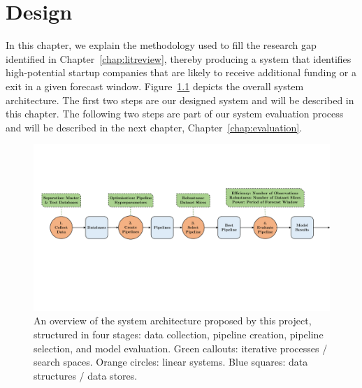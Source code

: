 \documentclass[../thesis/thesis.tex]{subfiles}
\begin{document}
\chapter{Design}
\label{chap:design}

In this chapter, we explain the methodology used to fill the research gap identified in Chapter~\ref{chap:litreview}, thereby producing a system that identifies high-potential startup companies that are likely to receive additional funding or a exit in a given forecast window. Figure~\ref{fig:design:system_architecture} depicts the overall system architecture. The first two steps are our designed system and will be described in this chapter. The following two steps are part of our system evaluation process and will be described in the next chapter, Chapter~\ref{chap:evaluation}.

\begin{figure}[!htb]
    \centering
    \includegraphics[width=\textwidth]{../figures/design/system_architecture}
    \caption[System architecture flowchart]{An overview of the system architecture proposed by this project, structured in four stages: data collection, pipeline creation, pipeline selection, and model evaluation. Green callouts: iterative processes / search spaces. Orange circles: linear systems. Blue squares: data structures / data stores.}
    \label{fig:design:system_architecture}
\end{figure}
\end{document}
